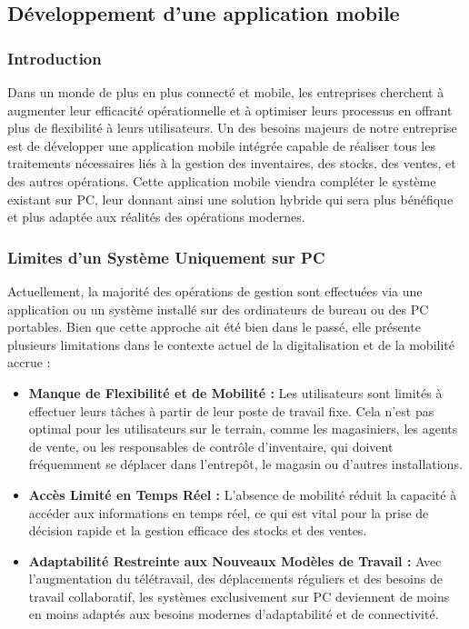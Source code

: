 \documentclass[a4paper, oneside, 12pt, final]{extreport}
\begin{document}
\subsection{Développement d'une application mobile}
\subsubsection{Introduction}
Dans un monde de plus en plus connecté et mobile, les entreprises cherchent à augmenter leur efficacité opérationnelle et à optimiser leurs processus en offrant plus de flexibilité à leurs utilisateurs. Un des besoins majeurs de notre entreprise est de développer une application mobile intégrée capable de réaliser tous les traitements nécessaires liés à la gestion des inventaires, des stocks, des ventes, et des autres opérations. Cette application mobile viendra compléter le système existant sur PC, leur donnant ainsi une solution hybride qui sera plus bénéfique et plus adaptée aux réalités des opérations modernes.

\subsubsection{Limites d'un Système Uniquement sur PC}
Actuellement, la majorité des opérations de gestion sont effectuées via une application ou un système installé sur des ordinateurs de bureau ou des PC portables. Bien que cette approche ait été bien dans le passé, elle présente plusieurs limitations dans le contexte actuel de la digitalisation et de la mobilité accrue :
\begin{itemize}


\item \textbf{Manque de Flexibilité et de Mobilité :} Les utilisateurs sont limités à effectuer leurs tâches à partir de leur poste de travail fixe. Cela n'est pas optimal pour les utilisateurs sur le terrain, comme les magasiniers, les agents de vente, ou les responsables de contrôle d'inventaire, qui doivent fréquemment se déplacer dans l'entrepôt, le magasin ou d'autres installations.

\item \textbf{Accès Limité en Temps Réel :} L'absence de mobilité réduit la capacité à accéder aux informations en temps réel, ce qui est vital pour la prise de décision rapide et la gestion efficace des stocks et des ventes.

\item \textbf{Adaptabilité Restreinte aux Nouveaux Modèles de Travail :} Avec l'augmentation du télétravail, des déplacements réguliers et des besoins de travail collaboratif, les systèmes exclusivement sur PC deviennent de moins en moins adaptés aux besoins modernes d'adaptabilité et de connectivité.
\end{itemize}
\end{document}
